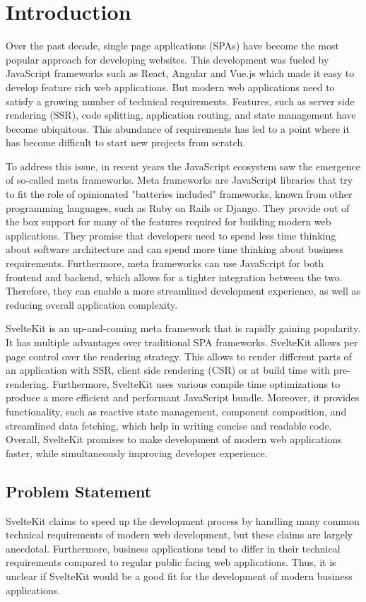 \chapter{Introduction}
\label{ch:introduction}
Over the past decade, single page applications (SPAs) have become the most popular approach for developing websites. This development was fueled by JavaScript frameworks such as React, Angular and Vue.js which made it easy to develop feature rich web applications. But modern web applications need to satisfy a growing number of technical requirements. Features, such as server side rendering (SSR), code splitting, application routing, and state management have become ubiquitous. This abundance of requirements has led to a point where it has become difficult to start new projects from scratch.

To address this issue, in recent years the JavaScript ecosystem saw the emergence of so-called meta frameworks. Meta frameworks are JavaScript libraries that try to fit the role of opinionated "batteries included" frameworks, known from other programming languages, such as Ruby on Rails or Django. They provide out of the box support for many of the features required for building modern web applications. They promise that developers need to spend less time thinking about software architecture and can spend more time thinking about business requirements. Furthermore, meta frameworks can use JavaScript for both frontend and backend, which allows for a tighter integration between the two. Therefore, they can enable a more streamlined development experience, as well as reducing overall application complexity.

SvelteKit is an up-and-coming meta framework that is rapidly gaining popularity. It has multiple advantages over traditional SPA frameworks. SvelteKit allows per page control over the rendering strategy. This allows to render different parts of an application with SSR, client side rendering (CSR) or at build time with pre-rendering. Furthermore, SvelteKit uses various compile time optimizations to produce a more efficient and performant JavaScript bundle. Moreover, it provides functionality, such as reactive state management, component composition, and streamlined data fetching, which help in writing concise and readable code. Overall, SvelteKit promises to make development of modern web applications faster, while simultaneously improving developer experience.

\section{Problem Statement}
\label{sec:problem-statement}
SvelteKit claims to speed up the development process by handling many common technical requirements of modern web development, but these claims are largely anecdotal. Furthermore, business applications tend to differ in their technical requirements compared to regular public facing web applications. Thus, it is unclear if SvelteKit would be a good fit for the development of modern business applications.


